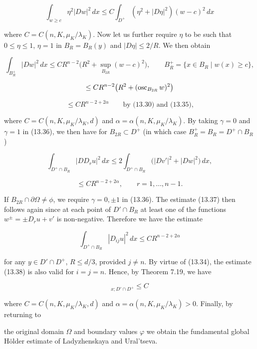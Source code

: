 \[
\int_{w\ge c}\eta^2|Dw|^2\,dx\le C\int_{D^+}(\eta^2+|D\eta|^2)(w-c)^2\,dx
\]

where $C=C(n,K,\mu_K/\lambda_K)$. Now let us further require $\eta$ to be such that $0\le\eta\le1$, $\eta=1$ in $B_R=B_R(y)$ and $|D\eta|\le 2/R$. We then obtain

\begin{equation}
\int_{B_R^+}|Dw|^2\,dx\le CR^{n-2}\bigl(R^2+\sup_{B_{2R}}(w-c)^2\bigr),\qquad B_R^+=\{x\in B_R\mid w(x)\ge c\},
\tag{13.36}
\end{equation}

\[
\le CR^{n-2}\bigl(R^2+(\operatorname{osc}_{B_{2R}}w)^2\bigr)
\]

\[
\le CR^{n-2+2\alpha}\qquad \text{by (13.30) and (13.35),}
\]

where $C=C(n,K,\mu_K/\lambda_K,d)$ and $\alpha=\alpha(n,K,\mu_K/\lambda_K)$. By taking $\gamma=0$ and $\gamma=1$ in (13.36), we then have for $B_{2R}\subset D^+$ (in which case $B_R^+=B_R=D^+\cap B_R$)

\begin{equation}
\int_{D^+\cap B_R}|DD_ru|^2\,dx\le 2\int_{D^+\cap B_R}\bigl(|Dv'|^2+|Dw|^2\bigr)\,dx,
\tag{13.37}
\end{equation}

\[
\le CR^{n-2+2\alpha},\qquad r=1,\ldots,n-1.
\]

If $B_{2R}\cap\partial\Omega\neq\phi$, we require $\gamma=0,\pm1$ in (13.36). The estimate (13.37) then follows again since at each point of $D'\cap B_R$ at least one of the functions $w^{\pm}=\pm D_ru+v'$ is non-negative. Therefore we have the estimate

\begin{equation}
\int_{D^+\cap B_R}|D_{ij}u|^2\,dx\le CR^{n-2+2\alpha}
\tag{13.38}
\end{equation}

for any $y\in D'\cap D^+$, $R\le d/3$, provided $j\neq n$. By virtue of (13.34), the estimate (13.38) is also valid for $i=j=n$. Hence, by Theorem 7.19, we have

\begin{equation}
[Du]_{x;D'\cap D^+}\le C
\tag{13.39}
\end{equation}

where $C=C(n,K,\mu_K/\lambda_K,d)$ and $\alpha=\alpha(n,K,\mu_K/\lambda_K)>0$. Finally, by returning to



the original domain $\Omega$ and boundary values $\varphi$ we obtain the fundamental global
H\"older estimate of Ladyzhenskaya and Ural'tseva.

